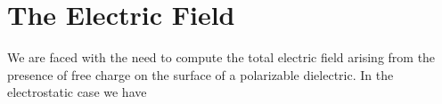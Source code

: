 \documentclass[a4paper, 12pt]{article}
\begin{document}
\section{The Electric Field}
\begin{comment}
Being thus armed with the assumption of a purely electrostatic problem (the electric field is conservative, that is $\nabla \times \mathbf{E} = 0$, where $\mathbf{E}$ is the electric field) we can describe the electric field by the Laplace equation for the electric potential. In the case of the volume charge density of the bulk medium to being zero, the divergence of the electric field is zero and we have

\begin{eqnarray}
\mathbf{E} &=& -\nabla \varphi \\
\nabla \cdot \mathbf{E} &=& 0\\
\nabla \cdot \mathbf{E} &=& - \nabla \cdot \nabla \varphi = \nabla^2 \varphi = 0,
\end{eqnarray}
it being convenient to solve the field in terms to $\varphi$ due to the form of the \emph{boundary conditions} usually given by
\begin{enumerate}
\item For finite charge distributions, the potential $\varphi$ goes to zero at infinity, is constant throughout a conductors, and is continuous across physical boundaries.
\item The normal component of the displacement vector $\mathbf{D}$, differs on two sides of a boundary by the free charge density $\rho_f$ residing on the boundary.
\item The tangential component of the field intensity $\mathbf{E}$ is continuous across a boundary.
\end{enumerate}

The in lieu to an analytical solution to Laplace's equation on a dielectric half-space domain by separation of variables or other methods we might try modeling the static charge distribution by a series of Dirac delta funtions after the fasion of a Green's function. In the 2D case we have,
\begin{equation}
\varphi(x,z) = \frac{z}{\pi}\int^\infty_{-\infty} \frac{\rho(x^\prime)}{(x-x^\prime)^2 + z^2}dx^\prime
\end{equation}
\end{comment}
We are faced with the need to compute the total electric field arising from the presence of free charge on the surface of a polarizable dielectric. In the electrostatic case we have
\end{document}
